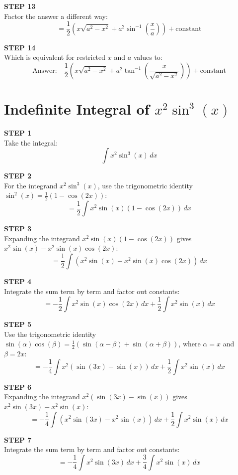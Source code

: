 \textbf{STEP 13} \\
Factor the answer a different way:
\[ = \frac{1}{2} \left(x \sqrt{a^2 - x^2} + a^2 \sin^{-1}\left(\frac{x}{a}\right)\right) + \text{constant} \]

\textbf{STEP 14} \\
Which is equivalent for restricted \( x \) and \( a \) values to:
\[ \text{Answer:} \quad \frac{1}{2} \left(x \sqrt{a^2 - x^2} + a^2 \tan^{-1}\left(\frac{x}{\sqrt{a^2 - x^2}}\right)\right) + \text{constant} \]


\section*{Indefinite Integral of \(  x^2 \sin^3(x) \)}

\textbf{STEP 1} \\
Take the integral:
\[ \int x^2 \sin^3(x) \, dx \]

\textbf{STEP 2} \\
For the integrand \( x^2 \sin^3(x) \), use the trigonometric identity \( \sin^2(x) = \frac{1}{2} (1 - \cos(2 x)) \):
\[ = \frac{1}{2} \int x^2 \sin(x) (1 - \cos(2 x)) \, dx \]

\textbf{STEP 3} \\
Expanding the integrand \( x^2 \sin(x) (1 - \cos(2 x)) \) gives \( x^2 \sin(x) - x^2 \sin(x) \cos(2 x) \):
\[ = \frac{1}{2} \int (x^2 \sin(x) - x^2 \sin(x) \cos(2 x)) \, dx \]

\textbf{STEP 4} \\
Integrate the sum term by term and factor out constants:
\[ = -\frac{1}{2} \int x^2 \sin(x) \cos(2 x) \, dx + \frac{1}{2} \int x^2 \sin(x) \, dx \]

\textbf{STEP 5} \\
Use the trigonometric identity \( \sin(\alpha) \cos(\beta) = \frac{1}{2} (\sin(\alpha - \beta) + \sin(\alpha + \beta)) \), where \( \alpha = x \) and \( \beta = 2 x \):
\[ = -\frac{1}{4} \int x^2 (\sin(3 x) - \sin(x)) \, dx + \frac{1}{2} \int x^2 \sin(x) \, dx \]

\textbf{STEP 6} \\
Expanding the integrand \( x^2 (\sin(3 x) - \sin(x)) \) gives \( x^2 \sin(3 x) - x^2 \sin(x) \):
\[ = -\frac{1}{4} \int (x^2 \sin(3 x) - x^2 \sin(x)) \, dx + \frac{1}{2} \int x^2 \sin(x) \, dx \]

\textbf{STEP 7} \\
Integrate the sum term by term and factor out constants:
\[ = -\frac{1}{4} \int x^2 \sin(3 x) \, dx + \frac{3}{4} \int x^2 \sin(x) \, dx \]

